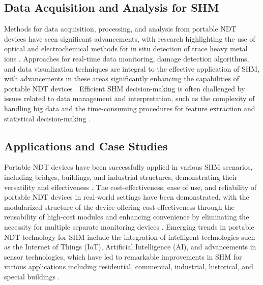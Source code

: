 \documentclass[journal, a4paper]{IEEEtran}
\begin{document}
\subsection{Data Acquisition and Analysis for SHM}
Methods for data acquisition, processing, and analysis from portable NDT
devices have seen significant advancements, with research highlighting the use of optical
and electrochemical methods for in situ detection of trace heavy metal ions \cite{hu_advances_2023}.
Approaches for real-time data monitoring, damage detection algorithms, and data visualization techniques
are integral to the effective application of SHM, with advancements in these areas
significantly enhancing the capabilities of portable NDT devices \cite{azimi_data-driven_2020} \cite{lingxin_review_2022}.
Efficient SHM decision-making is often challenged by issues related
to data management and interpretation, such as the complexity of handling big data and the time-consuming procedures
for feature extraction and statistical decision-making \cite{entezami_big_2020}.


\subsection{Applications and Case Studies}
Portable NDT devices have been successfully applied in various SHM
scenarios, including bridges, buildings, and industrial structures, demonstrating their versatility and effectiveness
\cite{parsy_shaping_2018} \cite{azimi_data-driven_2020}.
The cost-effectiveness, ease of use, and reliability of portable NDT
devices in real-world settings have been demonstrated, with the modularized structure of the device offering
cost-effectiveness through the reusability of high-cost modules and enhancing convenience by eliminating the
necessity for multiple separate monitoring devices \cite{lee_rationale_2023}.
Emerging trends in portable NDT technology for SHM
include the integration of intelligent technologies such as the Internet of Things (IoT), Artificial Intelligence (AI),
and advancements in sensor technologies, which have led to remarkable improvements in SHM for various applications
including residential, commercial, industrial, historical, and special buildings \cite{vijayan_development_2023} \cite{hassani_systematic_2023}. 
\end{document}
